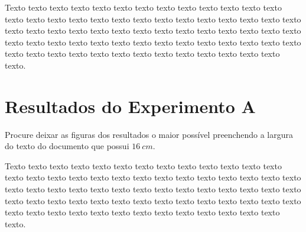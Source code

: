 Texto texto texto texto texto texto texto texto texto texto texto texto texto texto texto texto texto texto texto texto texto texto texto texto texto texto texto texto texto texto texto texto texto texto texto texto texto texto texto texto texto texto texto texto texto texto texto texto texto texto texto texto texto texto texto texto texto texto texto texto texto texto texto texto texto texto texto texto texto.

\section{Resultados do Experimento A}
\label{sec:resultados-do-experimento-a}

Procure deixar as figuras dos resultados o maior possível preenchendo a largura do texto do documento que possui $16~cm$.

\begin{figure}[H]
        \captionsetup{width=16cm}
			
\end{figure}

Texto texto texto texto texto texto texto texto texto texto texto texto texto texto texto texto texto texto texto texto texto texto texto texto texto texto texto texto texto texto texto texto texto texto texto texto texto texto texto texto texto texto texto texto texto texto texto texto texto texto texto texto texto texto texto texto texto texto texto texto texto texto texto texto texto texto texto texto texto.

